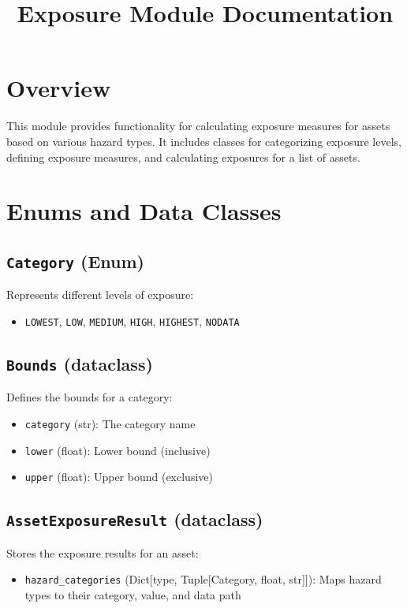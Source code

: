\documentclass{article}
\title{Exposure Module Documentation}
\author{}
\date{}
\begin{document}
\maketitle

\section{Overview}

This module provides functionality for calculating exposure measures for assets based on various hazard types. It includes classes for categorizing exposure levels, defining exposure measures, and calculating exposures for a list of assets.

\section{Enums and Data Classes}

\subsection{\texttt{Category} (Enum)}
Represents different levels of exposure:
\begin{itemize}
    \item \texttt{LOWEST}, \texttt{LOW}, \texttt{MEDIUM}, \texttt{HIGH}, \texttt{HIGHEST}, \texttt{NODATA}
\end{itemize}

\subsection{\texttt{Bounds} (dataclass)}
Defines the bounds for a category:
\begin{itemize}
    \item \texttt{category} (str): The category name
    \item \texttt{lower} (float): Lower bound (inclusive)
    \item \texttt{upper} (float): Upper bound (exclusive)
\end{itemize}

\subsection{\texttt{AssetExposureResult} (dataclass)}
Stores the exposure results for an asset:
\begin{itemize}
    \item \texttt{hazard\_categories} (Dict[type, Tuple[Category, float, str]]): Maps hazard types to their category, value, and data path
\end{itemize}
\end{document}
